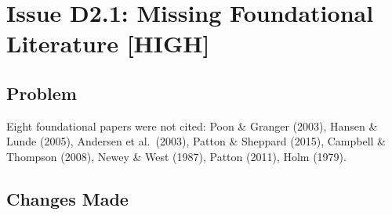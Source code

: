 \documentclass[12pt,a4paper]{article}
\begin{document}
\section{Issue D2.1: Missing Foundational Literature [HIGH]}

\subsection*{Problem}
Eight foundational papers were not cited: Poon \& Granger (2003), Hansen \& Lunde (2005), Andersen et al.\ (2003), Patton \& Sheppard (2015), Campbell \& Thompson (2008), Newey \& West (1987), Patton (2011), Holm (1979).

\subsection*{Changes Made}
\end{document}
